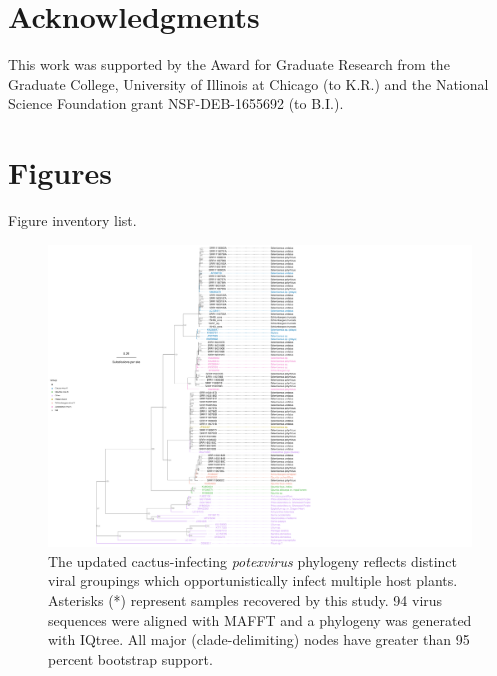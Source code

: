 \documentclass[fleqn,10pt,lineno]{wlpeerj}
\begin{document}
\section*{Acknowledgments}

This work was supported by the Award for Graduate Research from the Graduate College, University of Illinois at Chicago (to K.R.) and the National Science Foundation grant NSF-DEB-1655692 (to B.I.).

\clearpage
%




\pagebreak
\frenchspacing
\setlength{\parindent}{0.0in}

\section*{Figures}
Figure inventory list.



\begin{figure}[ht]
\centering
\includegraphics[width=1\linewidth]{full_tr_formal_tax.pdf}
 \begin{NoHyper}
 \caption{The updated cactus-infecting \textit{potexvirus} phylogeny reflects distinct viral groupings which opportunistically infect multiple host plants. Asterisks (*) represent samples recovered by this study. 94 virus sequences were aligned with MAFFT and a phylogeny was generated with IQtree. All major (clade-delimiting) nodes have greater than 95 percent bootstrap support.}
 \label{fig1}
 \end{NoHyper}
 \end{figure}
  
\end{document}
